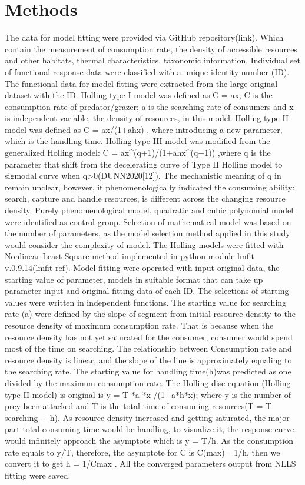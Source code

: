\documentclass[11pt, a4paper]{article}
\begin{document}
\section{Methods}
The data for model fitting were provided via GitHub repository(link). Which contain the measurement of consumption rate, the density of accessible resources and other habitats, thermal characteristics, taxonomic information. Individual set of functional response data were classified with a unique identity number (ID). The functional data for model fitting were extracted from the large original dataset with the ID. 
Holling type I model was defined as C = ax, C is the consumption rate of predator/grazer; a is the searching rate of consumers and x is independent variable, the density of resources, in this model. 
Holling type II model was defined as C = ax/(1+ahx) , where introducing a new parameter, which is the  handling time. 
Holling type III model was modified from the generalized Holling model: C = ax^(q+1)/(1+ahx^(q+1)) ,where q is the parameter that shift from the decelerating curve of Type II Holling model to sigmodal curve when q>0(DUNN2020[12]). The mechanistic meaning of q in remain unclear, however, it phenomenologically indicated the consuming ability: search, capture and handle resources, is different across the changing resource density. 
Purely phenomenological model, quadratic and cubic polynomial model were identified as control group. Selection of mathematical model was based on the number of parameters, as the model selection method applied in this study would consider the complexity of model. 
The Holling models were fitted with Nonlinear Least Square method implemented in python module lmfit v.0.9.14(lmfit ref). Model fitting were operated with input original data, the starting value of parameter, models in suitable format that can take up parameter input and original fitting data of each ID. The selections of starting values were written in independent functions. 
The starting value for searching rate (a) were defined by the slope of segment from initial resource density to the resource density of maximum consumption rate. That is because when the resource density has not yet saturated for the consumer, consumer would spend most of the time on searching. The relationship between Consumption rate and resource density is linear, and the slope of the line is approximately equaling to the searching rate. 
The starting value for handling time(h)was predicted as one divided by the maximum consumption rate. The Holling disc equation (Holling type II model) is original is y = T *a *x /(1+a*h*x); where y is the number of prey been attacked and T is the total time of consuming resources(T = T searching + h). As resource density increased and getting saturated, the major part total consuming time would be handling, to visualize it, the response curve would infinitely approach the asymptote which is y = T/h. As the consumption rate equals to y/T, therefore, the asymptote for C is C(max)= 1/h, then we convert it to get h = 1/Cmax . All the converged parameters output from NLLS fitting were saved. 
\end{document}
